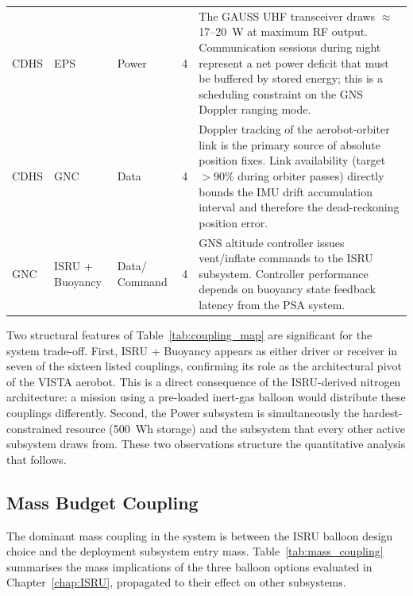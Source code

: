 \begin{longtable}{p{2cm}|p{1.9cm}|p{2cm}|p{1.4cm}|p{8cm}}
CDHS & EPS & Power & 4 & The GAUSS UHF transceiver draws $\approx$17--20~W at maximum RF output. Communication sessions during night represent a net power deficit that must be buffered by stored energy; this is a scheduling constraint on the GNS Doppler ranging mode. \\

CDHS & GNC & Data & 4 & Doppler tracking of the aerobot-orbiter link is the primary source of absolute position fixes. Link availability (target $>90\%$ during orbiter passes) directly bounds the IMU drift accumulation interval and therefore the dead-reckoning position error. \\

GNC & ISRU + Buoyancy & Data/ Command & 4 & GNS altitude controller issues vent/inflate commands to the ISRU subsystem. Controller performance depends on buoyancy state feedback latency from the PSA system. \\

\end{longtable}

Two structural features of Table~\ref{tab:coupling_map} are significant for the system trade-off. First, ISRU + Buoyancy appears as either driver or receiver in seven of the sixteen listed couplings, confirming its role as the architectural pivot of the VISTA aerobot. This is a direct consequence of the ISRU-derived nitrogen architecture: a mission using a pre-loaded inert-gas balloon would distribute these couplings differently. Second, the Power subsystem is simultaneously the hardest-constrained resource (500~Wh storage) and the subsystem that every other active subsystem draws from. These two observations structure the quantitative analysis that follows.

\subsection{Mass Budget Coupling}
\label{subsec:mass_coupling}

The dominant mass coupling in the system is between the ISRU balloon design choice and the deployment subsystem entry mass. Table~\ref{tab:mass_coupling} summarises the mass implications of the three balloon options evaluated in Chapter~\ref{chap:ISRU}, propagated to their effect on other subsystems.

